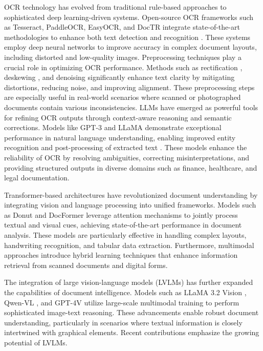 \documentclass[11pt]{article}
\begin{document}
OCR technology has evolved from traditional rule-based approaches to sophisticated deep learning-driven systems. Open-source OCR frameworks such as Tesseract, PaddleOCR, EasyOCR, and DocTR integrate state-of-the-art methodologies to enhance both text detection \cite{liao2019, liao2022} and recognition \cite{shi2015, li2022}. These systems employ deep neural networks to improve accuracy in complex document layouts, including distorted and low-quality images. Preprocessing techniques play a crucial role in optimizing OCR performance. Methods such as rectification \cite{shi2019}, deskewing \cite{pham2022}, and denoising \cite{zhao2018} significantly enhance text clarity by mitigating distortions, reducing noise, and improving alignment. These preprocessing steps are especially useful in real-world scenarios where scanned or photographed documents contain various inconsistencies. LLMs have emerged as powerful tools for refining OCR outputs through context-aware reasoning and semantic corrections. Models like GPT-3 \cite{brown2020} and LLaMA \cite{touvron2023} demonstrate exceptional performance in natural language understanding, enabling improved entity recognition and post-processing of extracted text \cite{yenduri2023}. These models enhance the reliability of OCR by resolving ambiguities, correcting misinterpretations, and providing structured outputs in diverse domains such as finance, healthcare, and legal documentation.

Transformer-based architectures \cite{vaswani2017, dosovitskiy2021} have revolutionized document understanding by integrating vision and language processing into unified frameworks. Models such as Donut \cite{kim2022} and DocFormer \cite{appalaraju2021} leverage attention mechanisms to jointly process textual and visual cues, achieving state-of-the-art performance in document analysis. These models are particularly effective in handling complex layouts, handwriting recognition, and tabular data extraction. Furthermore, multimodal approaches \cite{peng2022, li2021} introduce hybrid learning techniques that enhance information retrieval from scanned documents and digital forms.

The integration of large vision-language models (LVLMs) has further expanded the capabilities of document intelligence. Models such as LLaMA 3.2 Vision \cite{touvron2023}, Qwen-VL \cite{qwen2025}, and GPT-4V \cite{dai2023} utilize large-scale multimodal training to perform sophisticated image-text reasoning. These advancements enable robust document understanding, particularly in scenarios where textual information is closely intertwined with graphical elements. Recent contributions \cite{li2024, wei2024} emphasize the growing potential of LVLMs. 
\end{document}
